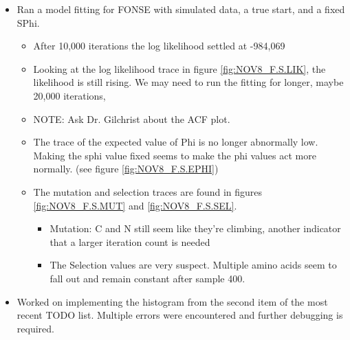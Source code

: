 \documentclass[11pt]{labbook}
\begin{document}
    \begin{itemize}
        \item Ran a model fitting for FONSE with simulated data, a true start, and a fixed SPhi.
            \begin{itemize}
                \item After 10,000 iterations the log likelihood settled at -984,069
                \item Looking at the log likelihood trace in figure \ref{fig:NOV8_F.S.LIK}, the likelihood is still rising.
                      We may need to run the fitting for longer, maybe 20,000 iterations,
                \item NOTE: Ask Dr. Gilchrist about the ACF plot.
                \item The trace of the expected value of Phi is no longer abnormally low.
                      Making the sphi value fixed seems to make the phi values act more normally. (see figure \ref{fig:NOV8_F.S.EPHI})
                \item The mutation and selection traces are found in figures \ref{fig:NOV8_F.S.MUT} and \ref{fig:NOV8_F.S.SEL}.
                    \begin{itemize}
                        \item Mutation: C and N still seem like they're climbing, another indicator that a larger iteration count is needed
                        \item The Selection values are very suspect.
                              Multiple amino acids seem to fall out and remain constant after sample 400.
                    \end{itemize}
            \end{itemize}
        \item Worked on implementing the histogram from the second item of the most recent TODO list.
              Multiple errors were encountered and further debugging is required.
    \end{itemize}
    
\end{document}
